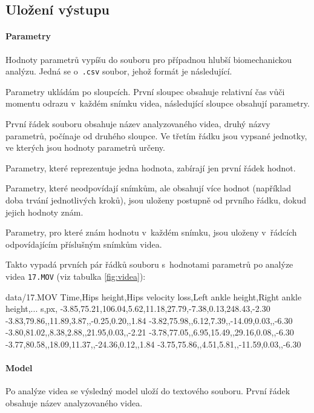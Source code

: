 \subsection{Uložení výstupu}
\label{ssec:ulozeni}

\paragraph{Parametry}

Hodnoty parametrů vypíšu do souboru pro případnou hlubší biomechanickou analýzu. Jedná se o~\texttt{.csv} soubor, jehož formát je následující.

Parametry ukládám po sloupcích. První sloupec obsahuje relativní čas vůči momentu odrazu v~každém snímku videa, následující sloupce obsahují parametry.

První řádek souboru obsahuje název analyzovaného videa, druhý názvy parametrů, počínaje od druhého sloupce. Ve třetím řádku jsou vypsané jednotky, ve kterých jsou hodnoty parametrů určeny.

Parametry, které reprezentuje jedna hodnota, zabírají jen první řádek hodnot.

Parametry, které neodpovídají snímkům, ale obsahují více hodnot (například doba trvání jednotlivých kroků), jsou uloženy postupně od prvního řádku, dokud jejich hodnoty znám.

Parametry, pro které znám hodnotu v~každém snímku, jsou uloženy v~řádcích odpovídajícím příslušným snímkům videa.

Takto vypadá prvních pár řádků souboru s~hodnotami parametrů po analýze videa \texttt{17.MOV} (viz tabulka \ref{fig:videa}):
\begin{code}[fontsize=\footnotesize]
data/17.MOV
Time,Hips height,Hips velocity loss,Left ankle height,Right ankle height,...
s,px,%
-3.85,75.21,106.04,5.62,11.18,27.79,-7.38,0.13,248.43,-2.30
-3.83,79.86,,11.89,3.87,,-0.25,0.20,,1.84
-3.82,75.98,,6.12,7.39,,-14.09,0.03,,-6.30
-3.80,81.02,,8.38,2.88,,21.95,0.03,,-2.21
-3.78,77.05,,6.95,15.49,,29.16,0.08,,-6.30
-3.77,80.58,,18.09,11.37,,-24.36,0.12,,1.84
-3.75,75.86,,4.51,5.81,,-11.59,0.03,,-6.30
\end{code}


\paragraph{Model}

Po analýze videa se výsledný model uloží do textového souboru. První řádek obsahuje název analyzovaného videa.

